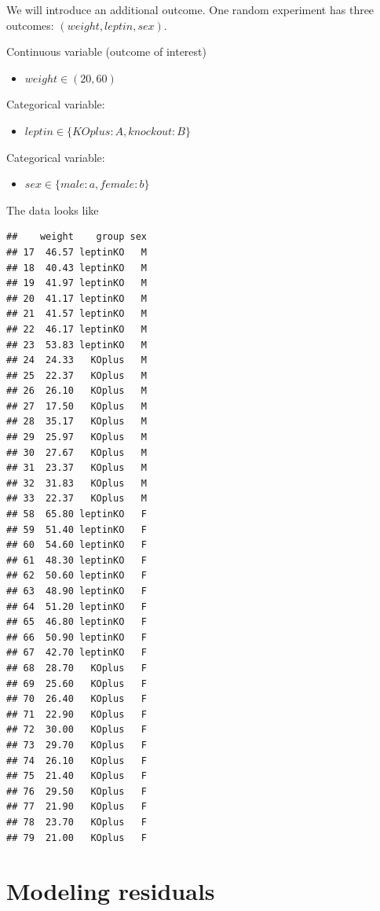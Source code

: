 \documentclass[
]{book}
\providecommand{\tightlist}{%
  \setlength{\itemsep}{0pt}\setlength{\parskip}{0pt}}
\begin{document}
We will introduce an additional outcome. One random experiment has three outcomes: \((weight, leptin, sex)\).

Continuous variable (outcome of interest)

\begin{itemize}
\tightlist
\item
  \(weight \in (20, 60)\)
\end{itemize}

Categorical variable:

\begin{itemize}
\tightlist
\item
  \(leptin \in \{KOplus:A,knockout:B\}\)
\end{itemize}

Categorical variable:

\begin{itemize}
\tightlist
\item
  \(sex \in \{male:a,female:b\}\)
\end{itemize}

The data looks like

\begin{verbatim}
##    weight    group sex
## 17  46.57 leptinKO   M
## 18  40.43 leptinKO   M
## 19  41.97 leptinKO   M
## 20  41.17 leptinKO   M
## 21  41.57 leptinKO   M
## 22  46.17 leptinKO   M
## 23  53.83 leptinKO   M
## 24  24.33   KOplus   M
## 25  22.37   KOplus   M
## 26  26.10   KOplus   M
## 27  17.50   KOplus   M
## 28  35.17   KOplus   M
## 29  25.97   KOplus   M
## 30  27.67   KOplus   M
## 31  23.37   KOplus   M
## 32  31.83   KOplus   M
## 33  22.37   KOplus   M
## 58  65.80 leptinKO   F
## 59  51.40 leptinKO   F
## 60  54.60 leptinKO   F
## 61  48.30 leptinKO   F
## 62  50.60 leptinKO   F
## 63  48.90 leptinKO   F
## 64  51.20 leptinKO   F
## 65  46.80 leptinKO   F
## 66  50.90 leptinKO   F
## 67  42.70 leptinKO   F
## 68  28.70   KOplus   F
## 69  25.60   KOplus   F
## 70  26.40   KOplus   F
## 71  22.90   KOplus   F
## 72  30.00   KOplus   F
## 73  29.70   KOplus   F
## 74  26.10   KOplus   F
## 75  21.40   KOplus   F
## 76  29.50   KOplus   F
## 77  21.90   KOplus   F
## 78  23.70   KOplus   F
## 79  21.00   KOplus   F
\end{verbatim}

\hypertarget{modeling-residuals}{%
\section{Modeling residuals}\label{modeling-residuals}}
\end{document}
